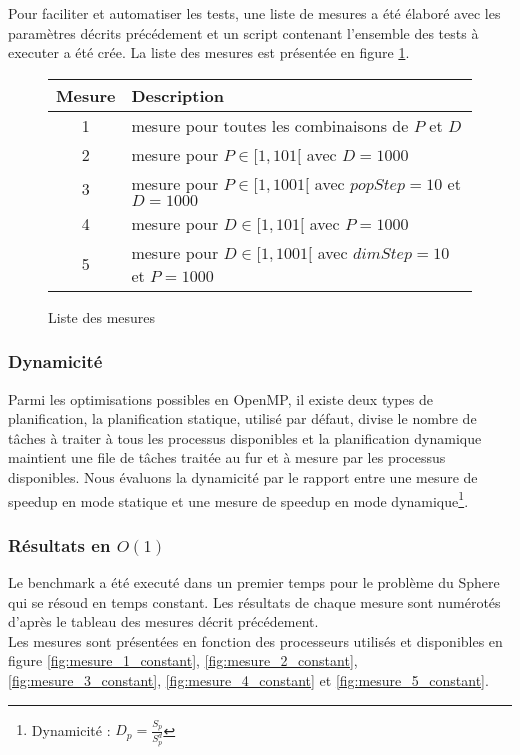 Pour faciliter et automatiser les tests, une liste de mesures a été élaboré avec les paramètres décrits précédement et un script contenant l'ensemble des tests à executer a été crée. La liste des mesures est présentée en figure \ref{fig:liste_mesures}.

\begin{figure}[here]
  \centering
  \begin{tabular}{ | c | l | }
    \hline
    \textbf{Mesure} & \textbf{Description}\\\hline
    1 & mesure pour toutes les combinaisons de $P$ et $D$\\\hline
    2 & mesure pour $P \in [1, 101[$ avec $D = 1000$\\\hline
    3 & mesure pour $P \in [1, 1001[$ avec $popStep = 10$ et $D = 1000$\\\hline
    4 & mesure pour $D \in [1, 101[$ avec $P = 1000$\\\hline
    5 & mesure pour $D \in [1, 1001[$ avec $dimStep = 10$ et $P = 1000$\\\hline
  \end{tabular}
  \caption{Liste des mesures}
  \label{fig:liste_mesures}
\end{figure}

\subsubsection{Dynamicité}

Parmi les optimisations possibles en OpenMP, il existe deux types de planification, la planification statique, utilisé par défaut, divise le nombre de tâches à traiter à tous les processus disponibles et la planification dynamique maintient une file de tâches traitée au fur et à mesure par les processus disponibles. Nous évaluons la dynamicité par le rapport entre une mesure de speedup en mode statique et une mesure de speedup en mode dynamique\footnote{Dynamicité : $D_p = \frac{S_p}{S_p^d}$}.

\subsubsection{Résultats en $O(1)$}

Le benchmark a été executé dans un premier temps pour le problème du Sphere qui se résoud en temps constant. Les résultats de chaque mesure sont numérotés d'après le tableau des mesures décrit précédement.\\

Les mesures sont présentées en fonction des processeurs utilisés et disponibles en figure \ref{fig:mesure_1_constant}, \ref{fig:mesure_2_constant}, \ref{fig:mesure_3_constant}, \ref{fig:mesure_4_constant} et \ref{fig:mesure_5_constant}.

